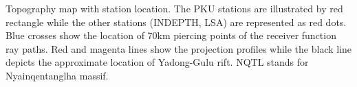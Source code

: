 \label{fig:topo}
Topography map with station location. The PKU stations are illustrated by red rectangle while the other stations (INDEPTH, LSA) are represented as red dots. Blue crosses show the location of 70km piercing points of the receiver function ray paths. Red and magenta lines show the projection profiles while the black line depicts the approximate location of Yadong-Gulu rift. NQTL stands for Nyainqentanglha massif.
